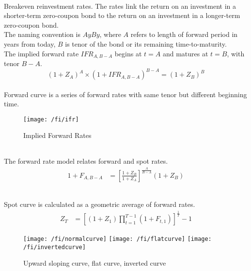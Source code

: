 \begin{method} \\
Breakeven reinvestment rates. The rates link the return on an investment in a shorter-term zero-coupon bond to the return on an investment in a longer-term zero-coupon bond.\\
The naming convention is $AyBy$, where $A$ refers to length of forward period in years from today, $B$ is tenor of the bond or its remaining time-to-maturity.\\
The implied forward rate $IFR_{A, B-A}$ begins at $t=A$ and matures at $t=B$, with tenor $B-A$.
\begin{equation}
(1+Z_A)^A \times (1+IFR_{A, B-A})^{B-A} = (1+Z_B)^B \nonumber
\end{equation}\\
Forward curve is a series of forward rates with same tenor but different beginning time.\\
\end{method}

\begin{figure}[H]
\centering
\texttt{[image: /fi/ifr]}
\caption{Implied Forward Rates}
\end{figure}

\begin{method} \\
The forward rate model relates forward and spot rates.
\begin{align}
1 + F_{A, B-A} &= \left[ \frac{1+Z_B}{1+Z_A} \right]^{\frac{A}{B-A}} (1+Z_B) \nonumber
\end{align}
\end{method}

\begin{method} \\
Spot curve is calculated as a geometric average of forward rates.
\begin{align}
Z_T &= \left[(1+Z_1)\prod\limits_{t=1}^{T-1} (1+F_{t,1}) \right]^{\frac{1}{T}} - 1 \nonumber
\end{align}
\end{method}

\begin{figure}[H]
\centering
\texttt{[image: /fi/normalcurve]}\hfill
\texttt{[image: /fi/flatcurve]}\hfill
\texttt{[image: /fi/invertedcurve]}
\caption{Upward sloping curve, flat curve, inverted curve}
\end{figure}

